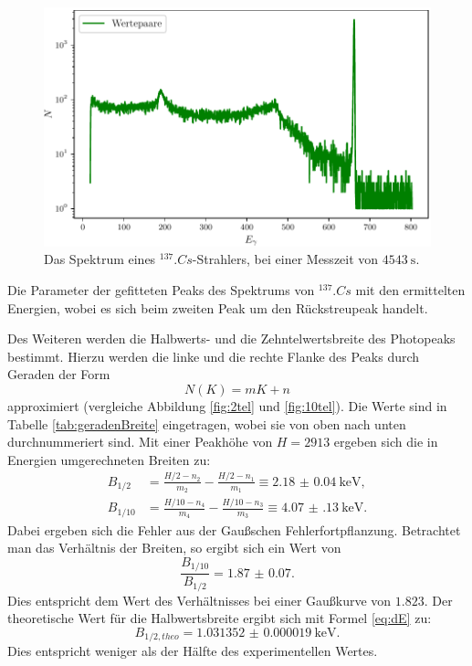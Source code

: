 \begin{figure}
	\centering
	\includegraphics[width=\linewidth-60pt,height=\textheight-60pt,keepaspectratio]{content/images/Cs137.pdf}
	\caption{Das Spektrum eines $^{137}.{Cs}$-Strahlers, bei einer Messzeit von $\SI{4543}{\second}$.}
	\label{fig:SpektrumCs}
\end{figure}

\begin{table}
	\centering
	\caption{Die Parameter der gefitteten Peaks des Spektrums von $^{137}.{Cs}$ mit den ermittelten Energien, wobei es sich beim zweiten Peak um den Rückstreupeak handelt.}
	
	\label{tab:parameterCs}
\end{table}

\noindent Des Weiteren werden die Halbwerts- und die Zehntelwertsbreite des Photopeaks bestimmt. Hierzu werden die linke und die rechte Flanke des Peaks durch Geraden der Form 
\begin{equation}
N(K) = mK+n	\label{eq:Gerade}
\end{equation}
approximiert (vergleiche Abbildung \ref{fig:2tel} und \ref{fig:10tel}). Die Werte sind in Tabelle \ref{tab:geradenBreite} eingetragen, wobei sie von oben nach unten durchnummeriert sind. Mit einer Peakhöhe von $H=2913$ ergeben sich die in Energien umgerechneten Breiten zu:
\begin{align*}
B_{1/2} &= \frac{H/2-n_2}{m_2}-\frac{H/2-n_1}{m_1} \equiv \SI{2.18(4)}{\kilo\electronvolt}\text{,}\\
B_{1/10} &= \frac{H/10-n_4}{m_4}-\frac{H/10-n_3}{m_3} \equiv \SI{4.07(13)}{\kilo\electronvolt}\text{.}
\end{align*}
Dabei ergeben sich die Fehler aus der Gaußschen Fehlerfortpflanzung.
Betrachtet man das Verhältnis der Breiten, so ergibt sich ein Wert von 
\[
\frac{B_{1/10}}{B_{1/2}} = \num{1.87(7)}\text{.}
\]
Dies entspricht dem Wert des Verhältnisses bei einer Gaußkurve von $\num{1.823}$.
Der theoretische Wert für die Halbwertsbreite ergibt sich mit Formel \eqref{eq:dE} zu:
\[
B_{1/2,theo} = \SI{1.031352(19)}{\kilo\electronvolt}\text{.}
\]
Dies entspricht weniger als der Hälfte des experimentellen Wertes.

